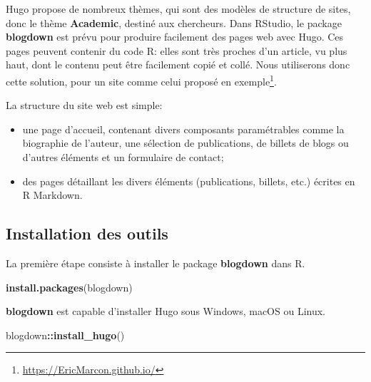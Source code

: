 \documentclass[
  12pt,
  french,
  a4paper,
  extrafontsizes,onecolumn,openright
  ]{memoir}
\newenvironment{Shaded}{\begin{snugshade}}{\end{snugshade}}
\newcommand{\FunctionTok}[1]{\textcolor[rgb]{0.13,0.29,0.53}{\textbf{#1}}}
\newcommand{\NormalTok}[1]{#1}
\newcommand{\SpecialCharTok}[1]{\textcolor[rgb]{0.81,0.36,0.00}{\textbf{#1}}}
\newcommand{\StringTok}[1]{\textcolor[rgb]{0.31,0.60,0.02}{#1}}
\providecommand{\tightlist}{%
  \setlength{\itemsep}{0pt}\setlength{\parskip}{0pt}}
\begin{document}
Hugo propose de nombreux thèmes, qui sont des modèles de structure de sites, donc le thème \textbf{Academic}, destiné aux chercheurs.
Dans RStudio, le package \textbf{blogdown} est prévu pour produire facilement des pages web avec Hugo.
Ces pages peuvent contenir du code R: elles sont très proches d'un article, vu plus haut, dont le contenu peut être facilement copié et collé.
Nous utiliserons donc cette solution, pour un site comme celui proposé en exemple\footnote{\url{https://EricMarcon.github.io/}}.

La structure du site web est simple:

\begin{itemize}
\tightlist
\item
  une page d'accueil, contenant divers composants paramétrables comme la biographie de l'auteur, une sélection de publications, de billets de blogs ou d'autres éléments et un formulaire de contact;
\item
  des pages détaillant les divers éléments (publications, billets, etc.) écrites en R Markdown.
\end{itemize}

\subsection{Installation des outils}\label{installation-des-outils}

La première étape consiste à installer le package \textbf{blogdown} dans R.

\scriptsize

\begin{Shaded}
\begin{Highlighting}[]
\FunctionTok{install.packages}\NormalTok{(}\StringTok{\textquotesingle{}blogdown\textquotesingle{}}\NormalTok{) }
\end{Highlighting}
\end{Shaded}

\normalsize

\textbf{blogdown} est capable d'installer Hugo sous Windows, macOS ou Linux.

\scriptsize

\begin{Shaded}
\begin{Highlighting}[]
\NormalTok{blogdown}\SpecialCharTok{::}\FunctionTok{install\_hugo}\NormalTok{()}
\end{Highlighting}
\end{Shaded}

\normalsize
\end{document}
